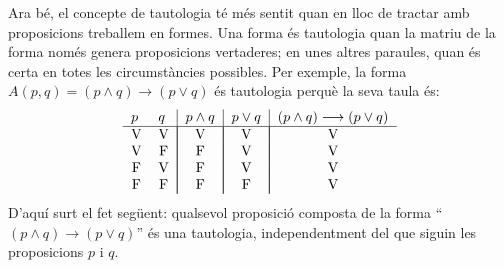 Ara bé, el concepte de tautologia té més sentit quan en lloc de
tractar amb proposicions treballem en formes. Una forma és tautologia
quan la matriu de la forma només genera proposicions vertaderes; en unes
altres paraules, quan és certa en totes les circumstàncies
possibles. Per exemple, la forma $A(p,q)=(p\wedge q)\longrightarrow(p\vee q)
$ és tautologia perquè la seva taula és:\begin{equation*}
\begin{tabular}{ll|l|l|l}
$p$ & $q$ & $p\wedge q$ & $p\vee q$ & $(p\wedge q)\longrightarrow(p\vee q)$
\\ \hline
\multicolumn{1}{c}{V} & \multicolumn{1}{c|}{V} & \multicolumn{1}{|c|}{V} &
\multicolumn{1}{|c|}{V} & \multicolumn{1}{|c}{V} \\
\multicolumn{1}{c}{V} & \multicolumn{1}{c|}{F} & \multicolumn{1}{|c|}{F} &
\multicolumn{1}{|c|}{V} & \multicolumn{1}{|c}{V} \\
\multicolumn{1}{c}{F} & \multicolumn{1}{c|}{V} & \multicolumn{1}{|c|}{F} &
\multicolumn{1}{|c|}{V} & \multicolumn{1}{|c}{V} \\
\multicolumn{1}{c}{F} & \multicolumn{1}{c|}{F} & \multicolumn{1}{|c|}{F} &
\multicolumn{1}{|c|}{F} & \multicolumn{1}{|c}{V}\end{tabular}
\end{equation*}
D'aquí surt el fet següent: qualsevol proposició composta de la
forma \enquote{$(p\wedge q)\longrightarrow(p\vee q)$} és una tautologia,
independentment del que siguin les proposicions $p$ i $q$.

\bigskip

